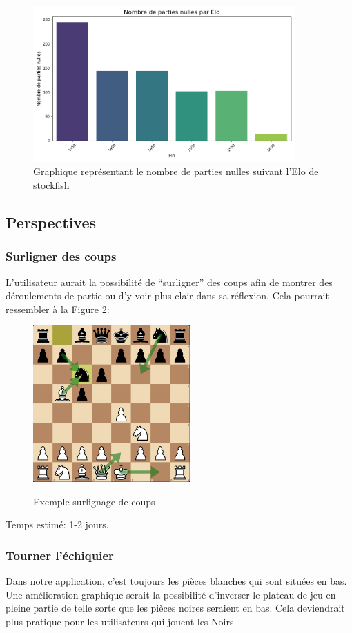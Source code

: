 \documentclass{article}
\begin{document}
\begin{figure}[h]
    \centering
    \includegraphics[width=\textwidth,height=6.0cm,keepaspectratio]{drawRate.png}
    \caption{Graphique représentant le nombre de parties nulles suivant l'Elo de stockfish}
    \label{drawCountCmp}
\end{figure}
\FloatBarrier



\subsection{Perspectives}
\subsubsection{Surligner des coups}
L'utilisateur aurait la possibilité de ``surligner'' des coups afin de montrer des déroulements de partie ou d'y voir plus clair dans sa réflexion.
Cela pourrait ressembler à la Figure \ref{surlignage}:
\begin{figure}[h]
    \caption{Exemple surlignage de coups}
    \centering
    \includegraphics[width=\textwidth,height=6.0cm,keepaspectratio]{surlignage-coups}
    \label{surlignage}
\end{figure}
\FloatBarrier

Temps estimé: 1-2 jours.

\subsubsection{Tourner l'échiquier}
Dans notre application, c'est toujours les pièces blanches qui sont situées en bas. Une amélioration graphique serait la possibilité d'inverser le plateau
de jeu en pleine partie de telle sorte que les pièces noires seraient en bas. Cela deviendrait plus pratique pour les utilisateurs qui jouent les Noirs.
\end{document}
